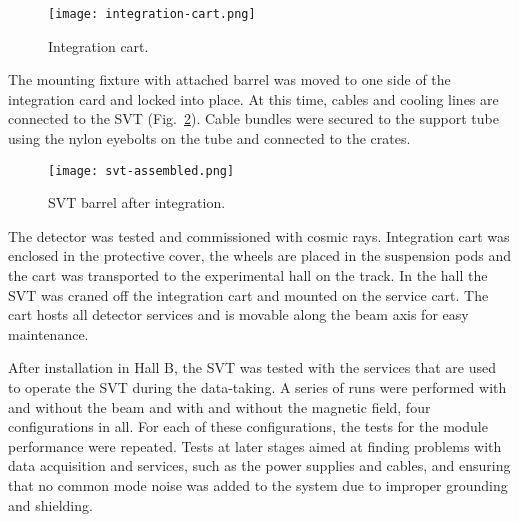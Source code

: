 \begin{figure}[hbt] 
\centering 
\texttt{[image: integration-cart.png]}
\caption{Integration cart.}
\label{fig:integration-cart}
\end{figure}

The mounting fixture with attached barrel was moved to one side of the integration card and locked into place. At this time, cables and cooling lines are connected to the SVT (Fig.~\ref{fig:svt-assembled}). Cable bundles were secured to the support tube using the nylon eyebolts on the tube and connected to the crates. 

\begin{figure}[hbt] 
\centering 
\texttt{[image: svt-assembled.png]}
\caption{SVT barrel after integration.}
\label{fig:svt-assembled}
\end{figure}

The detector was tested and commissioned with cosmic rays. Integration cart was enclosed in the protective cover, the wheels are placed in the suspension pods and the cart was transported to the experimental hall on the track. In the hall the SVT was craned off the integration cart and mounted on the service cart. The cart hosts all detector services and is movable along the beam axis for easy maintenance.

After installation in Hall B, the SVT was tested with the services that are used to operate the SVT during the data-taking. A series of runs were performed with and without the beam and with and without the magnetic field, four configurations in all. For each of these configurations, the tests for the module performance were repeated. Tests at later stages aimed at finding problems with data acquisition and services, such as the power supplies and cables, and ensuring that no common mode noise was added to the system due to improper grounding and shielding. 
